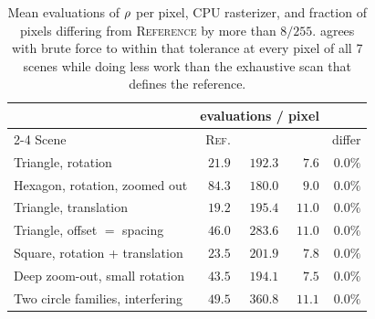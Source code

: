 \begin{table}[t]
  \centering
  \small
  \caption{Mean evaluations of $\rho$ per pixel, CPU rasterizer, and fraction of
  pixels differing from \textsc{Reference} by more than $8/255$. \ours{} agrees
  with brute force to within that tolerance at every pixel of all 7 scenes
  while doing less work than the exhaustive scan that defines the reference.}
  \label{tab:cost}
  \begin{tabular}{@{}lrrrr@{}}
    \toprule
    & \multicolumn{3}{c}{evaluations / pixel} & \ours{} \\
    \cmidrule(lr){2-4}
    Scene & \textsc{Ref.} & \sweep{} & \ours{} & differ \\
    \midrule
    Triangle, rotation & $21.9$ & $192.3$ & $7.6$ & $0.0\%$ \\
    Hexagon, rotation, zoomed out & $84.3$ & $180.0$ & $9.0$ & $0.0\%$ \\
    Triangle, translation & $19.2$ & $195.4$ & $11.0$ & $0.0\%$ \\
    Triangle, offset $=$ spacing & $46.0$ & $283.6$ & $11.0$ & $0.0\%$ \\
    Square, rotation + translation & $23.5$ & $201.9$ & $7.8$ & $0.0\%$ \\
    Deep zoom-out, small rotation & $43.5$ & $194.1$ & $\mathbf{7.5}$ & $0.0\%$ \\
    Two circle families, interfering & $49.5$ & $360.8$ & $11.1$ & $0.0\%$ \\
    \bottomrule
  \end{tabular}
\end{table}
